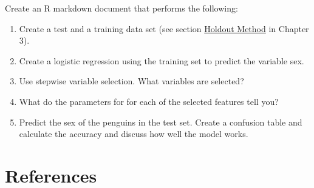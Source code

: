 \documentclass[
  notitlepage]{book}
\providecommand{\tightlist}{%
  \setlength{\itemsep}{0pt}\setlength{\parskip}{0pt}}
\begin{document}
Create an R markdown document that performs the following:

\begin{enumerate}
\def\labelenumi{\arabic{enumi}.}
\tightlist
\item
  Create a test and a training data set (see section \protect\hyperlink{holdout-method}{Holdout Method} in Chapter 3).
\item
  Create a logistic regression using the training set to predict the variable sex.
\item
  Use stepwise variable selection. What variables are selected?
\item
  What do the parameters for for each of the selected features tell you?
\item
  Predict the sex of the penguins in the test set. Create a
  confusion table and calculate the accuracy and discuss how well the model works.
\end{enumerate}

\hypertarget{references}{%
\chapter*{References}\label{references}}
\end{document}
